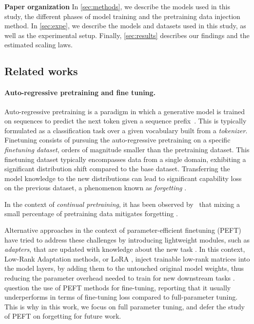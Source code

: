 \textbf{Paper organization}
In \autoref{sec:methods}, we describe the models used in this study, the different phases of model training and the pretraining data injection method.
In \autoref{sec:expe}, we describe the models and datasets used in this study, as well as the experimental setup.
Finally, \autoref{sec:results} describes our findings and the estimated scaling laws.

\subsection{Related works}

\paragraph{Auto-regressive pretraining and fine tuning.} Auto-regressive pretraining is a paradigm in which a generative model is trained on sequences to predict the next token given a sequence prefix~\citep{sutskever2014sequence}. This is typically formulated as a classification task over a given vocabulary built from a \textit{tokenizer}. 
Finetuning consists of pursuing the auto-regressive pretraining on a specific \textit{finetuning dataset}, orders of magnitude smaller than the pretraining dataset. 
This finetuning dataset typically encompasses data from a single domain, exhibiting a significant distribution shift compared to the base dataset. 
Transferring the model knowledge to the new distributions can lead to significant capability loss on the previous dataset, a phenomenon known as \textit{forgetting} \cite{luo2023empirical,kalajdzievski2024scaling}.

In the context of \textit{continual pretraining}, it has been observed by~\citet{ibrahim2024simple} that mixing a small percentage of pretraining data mitigates forgetting \citep[see][for an analytical framework to explore how task similarity can affect knowledge transfer]{hiratani2024disentangling}.




Alternative approaches in the context of parameter-efficient finetuning (PEFT) have tried to address these challenges by introducing lightweight modules, such as \textit{adapters}, that are updated with knowledge about the new task \cite{houlsby2019parameter, he2022unified}. 
In this context, Low-Rank Adaptation methods, or LoRA \cite{hu2021lora, zhang2024when}, inject trainable low-rank matrices into the model layers, by adding them to the untouched original model weights, thus reducing the parameter overhead needed to train for new downstream tasks \citep[see][for a discussion on the different roles of LoRA decomposition matrices]{zhu2024asymmetry}.
\citet{zhang2024when} question the use of PEFT methods for fine-tuning, reporting that it usually underperforms in terms of fine-tuning loss compared to full-parameter tuning. 
This is why in this work, we focus on full parameter tuning, and defer the study of PEFT on forgetting for future work. 

